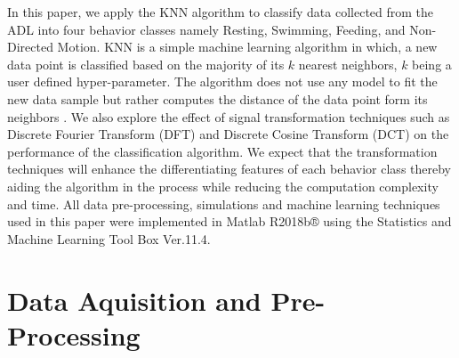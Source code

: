 \documentclass[conference]{IEEEtran}
\begin{document}
In this paper, we apply the KNN algorithm to classify data collected from the ADL into four behavior classes namely Resting, Swimming, Feeding, and Non-Directed Motion. KNN is a simple machine learning algorithm in which, a new data point is classified based on the majority of its $k$ nearest neighbors, $k$ being a user defined hyper-parameter. The algorithm does not use any model to fit the new data sample but rather computes the distance of the data point form its neighbors  \cite{7}. We also explore the effect of signal transformation techniques such as Discrete Fourier Transform (DFT) and Discrete Cosine Transform (DCT) on the performance of the classification algorithm. We expect that the transformation techniques will enhance the differentiating features of each behavior class thereby aiding the algorithm in the process while reducing the computation complexity and time. All data pre-processing, simulations and machine learning techniques used in this paper were implemented in Matlab R2018b® using the Statistics and Machine Learning Tool Box Ver.11.4.

\section{Data Aquisition and Pre-Processing}
\end{document}
